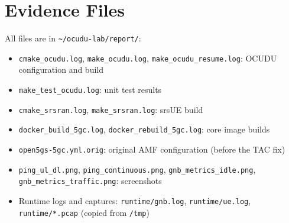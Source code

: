 \documentclass[11pt,a4paper]{article}
\newcommand{\fpath}[1]{\texttt{#1}}
\begin{document}
\section{Evidence Files}

All files are in \fpath{\textasciitilde/ocudu-lab/report/}:
\begin{itemize}[itemsep=1pt]
  \item \fpath{cmake\_ocudu.log}, \fpath{make\_ocudu.log}, \fpath{make\_ocudu\_resume.log}: OCUDU configuration and build
  \item \fpath{make\_test\_ocudu.log}: unit test results
  \item \fpath{cmake\_srsran.log}, \fpath{make\_srsran.log}: srsUE build
  \item \fpath{docker\_build\_5gc.log}, \fpath{docker\_rebuild\_5gc.log}: core image builds
  \item \fpath{open5gs-5gc.yml.orig}: original AMF configuration (before the TAC fix)
  \item \fpath{ping\_ul\_dl.png}, \fpath{ping\_continuous.png}, \fpath{gnb\_metrics\_idle.png}, \fpath{gnb\_metrics\_traffic.png}: screenshots
  \item Runtime logs and captures: \fpath{runtime/gnb.log}, \fpath{runtime/ue.log}, \fpath{runtime/*.pcap} (copied from \fpath{/tmp})
\end{itemize}
\end{document}
